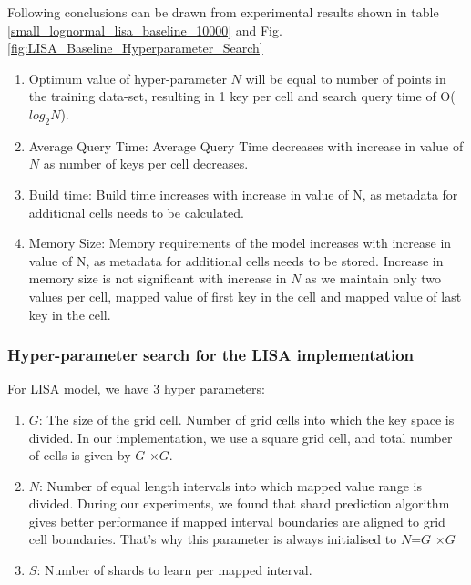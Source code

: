 \begin{mscconclusion}
	Following conclusions can be drawn from experimental results shown in table \ref{small_lognormal_lisa_baseline_10000} and Fig. \ref{fig:LISA_Baseline_Hyperparameter_Search}
\begin{enumerate}
    \item Optimum value of hyper-parameter $N$ will be equal to number of points in the training data-set, resulting in 1 key per cell and search query time of O($log_{2}N$).
	
	\item Average Query Time:  Average Query Time decreases with increase in value of $N$ as number of keys per cell decreases.
	\item Build time: Build time increases with increase in value of N, as metadata for additional cells needs to be calculated. 
	\item Memory Size:  Memory requirements of the model increases with increase in value of N, as metadata for additional cells needs to be stored. Increase  in memory size is not significant with increase in $N$ as we maintain only two values per cell, mapped value of first key in the cell and mapped value of last key in the cell.
\end{enumerate}
\end{mscconclusion}

\subsubsection {Hyper-parameter search for the LISA implementation}
For LISA model, we have 3 hyper parameters:
\begin{enumerate}
	\item $G$: The size of the grid cell. Number of grid cells into which the key space is divided. In our implementation, we use a square grid cell, and total number of cells is given by $G$ $\times G$.
	\item $N$: Number of equal length intervals into which mapped value range is divided. During our experiments, we found that shard prediction algorithm gives better performance if mapped interval boundaries are aligned to grid cell boundaries. That's why this parameter is always initialised to $N$=$G$ $\times G$   
	\item $S$: Number of shards to learn per mapped interval. 
\end{enumerate}


